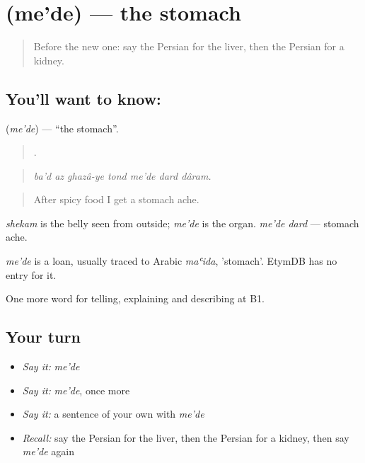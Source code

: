 \section[\texorpdfstring{\fa{معده} (me'de)}{معده (me'de)}]{ (me'de) — the stomach}

\label{lesson:FA-C495-mede}



\begin{quote}
Before the new one: say the Persian for the liver, then the Persian for a kidney.
\end{quote}

\subsection*{You'll want to know: }
\textbf{} (\emph{me'de}) — \textquotedblleft{}the stomach\textquotedblright{}.

\begin{quote}
      .
\end{quote}

\begin{quote}
\emph{ba'd az ghazâ-ye tond me'de dard dâram.}
\end{quote}

\begin{quote}
After spicy food I get a stomach ache.
\end{quote}

\emph{shekam} is the belly seen from outside; \emph{me'de} is the organ. \emph{me'de dard} — stomach ache.

\begin{cousinweb}
\emph{me'de} is a loan, usually traced to Arabic \emph{maʿida}, 'stomach'. EtymDB has no entry for it.
\end{cousinweb}

\begin{grammarlens}[title={What you've built}]
One more word for telling, explaining and describing at B1.
\end{grammarlens}

\subsection*{Your turn}
\begin{itemize}
\raggedright
  \item \emph{Say it:} \emph{me'de}
  \item \emph{Say it:} \emph{me'de}, once more
  \item \emph{Say it:} a sentence of your own with \emph{me'de}
  \item \emph{Recall:} say the Persian for the liver, then the Persian for a kidney, then say \emph{me'de} again
\end{itemize}

